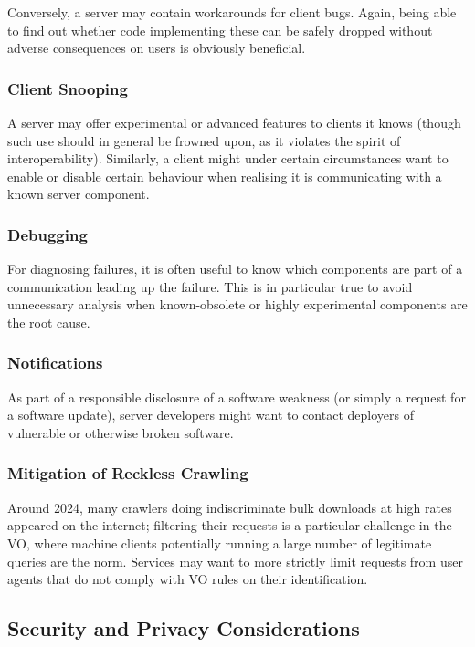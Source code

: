 \documentclass[11pt,a4paper]{ivoa}
\begin{document}
Conversely, a server may contain workarounds for client bugs.  Again,
being able to find out whether code implementing these can be safely
dropped without adverse consequences on users is obviously beneficial.

\subsubsection{Client Snooping}

A server may offer experimental or advanced features to clients it knows
(though such use should in general be frowned upon, as it violates the
spirit of interoperability).  Similarly, a client might under certain
circumstances want to enable or disable certain behaviour when realising
it is communicating with a known server component.

\subsubsection{Debugging}

For diagnosing failures, it is often useful to know which components are
part of a communication leading up the failure.  This is in particular
true to avoid unnecessary analysis when known-obsolete or highly
experimental components are the root cause.

\subsubsection{Notifications}

As part of a responsible disclosure of a software weakness (or simply a
request for a software update), server developers might want to contact
deployers of vulnerable or otherwise broken software.

\subsubsection{Mitigation of Reckless Crawling}

Around 2024, many crawlers doing indiscriminate bulk downloads at high
rates appeared on the internet; filtering their requests is a particular
challenge in the VO, where machine clients potentially running a large
number of legitimate queries are the norm.  Services may want to more
strictly limit requests from user agents that do not comply with VO
rules on their identification.

\subsection{Security and Privacy Considerations}
\end{document}
